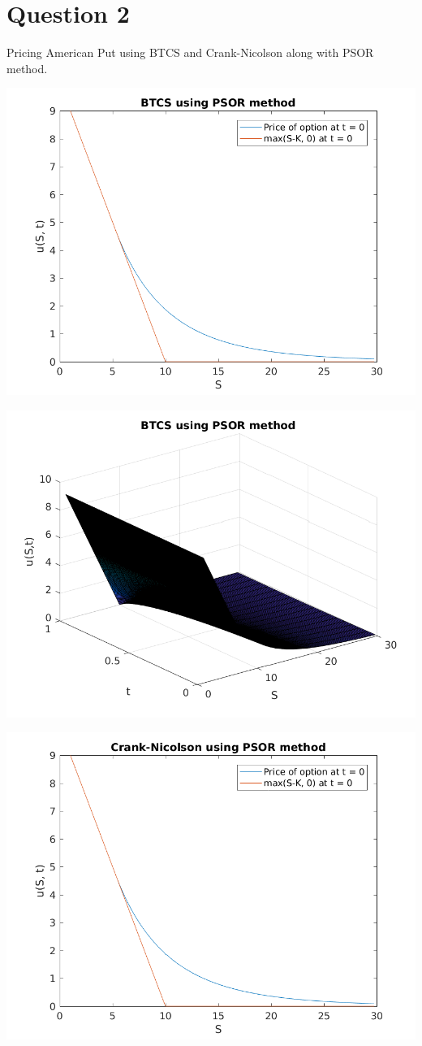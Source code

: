 \documentclass{article}
\begin{document}
\section{Question 2}
Pricing American Put using BTCS and Crank-Nicolson along with PSOR method.

\includegraphics{"q2_1"}
\pagebreak


\includegraphics{"q2_2"}
\pagebreak


\includegraphics{"q2_3"}
\pagebreak
\end{document}
